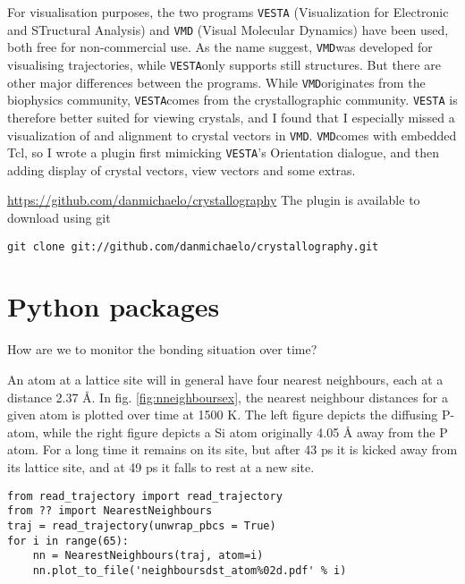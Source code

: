 \documentclass[11pt,bibliography=totoc,index=totoc]{scrbook}   %
\newcommand{\vesta}{{\texttt{VESTA}}} %
\newcommand{\vmd}{{\texttt{VMD}}} %
\begin{document}
For visualisation purposes, the two programs {\vesta} (Visualization for Electronic and STructural Analysis) and {\vmd} (Visual Molecular Dynamics) have been used, both free for non-commercial use.
As the name suggest, \vmd was developed for visualising trajectories, while \vesta only supports still structures.
But there are other major differences between the programs. While \vmd originates from the biophysics community, \vesta comes from the crystallographic community.
{\vesta} is therefore better suited for viewing crystals, and I found that I especially missed a visualization of and alignment to crystal vectors in \vmd.
\vmd comes with embedded Tcl, so I wrote a plugin first mimicking \vesta's Orientation dialogue, and then adding 
display of crystal vectors, view vectors and some extras.

\url{https://github.com/danmichaelo/crystallography}
The plugin is available to download using git
\lstset{language=Bash}
\begin{lstlisting}
git clone git://github.com/danmichaelo/crystallography.git
\end{lstlisting}

\section{Python packages}

How are we to monitor the bonding situation over time?

An atom at a lattice site will in general have four nearest neighbours, each at a distance 2.37 Å.
In fig. \ref{fig:nneighboursex}, the nearest neighbour distances for a given atom is plotted over time 
at 1500 K.
The left figure depicts the diffusing P-atom, while the right figure depicts a Si atom originally 4.05 Å 
away from the P atom. 
For a long time it remains on its site, but after 43 ps it is kicked away from its lattice site, 
and at 49 ps it falls to rest at a new site.

\begin{lstlisting}
from read_trajectory import read_trajectory
from ?? import NearestNeighbours
traj = read_trajectory(unwrap_pbcs = True)
for i in range(65):
    nn = NearestNeighbours(traj, atom=i)
    nn.plot_to_file('neighboursdst_atom%02d.pdf' % i)
\end{lstlisting}
\end{document}
